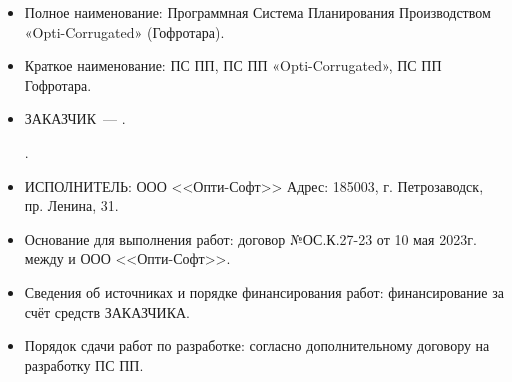 




\begin{itemize}

    \item Полное наименование: Программная Система Планирования Производством «Opti-Corrugated» (Гофротара).

    \item Краткое наименование: ПС ПП, ПС ПП «Opti-Corrugated», ПС ПП Гофротара.

    \item ЗАКАЗЧИК~--- \FIRMA.

\CURADDRESS.  

    \item ИСПОЛНИТЕЛЬ: ООО <<Опти-Софт>>
Адрес: 185003, г. Петрозаводск, пр. Ленина, 31.

    \item Основание для выполнения работ: договор {№ОС.К.27-23 от 10 мая 2023г.} между \FIRMA и ООО <<Опти-Софт>>.
    \item Сведения об источниках и порядке финансирования работ: финансирование за счёт средств ЗАКАЗЧИКА.

    \item Порядок сдачи работ по разработке: согласно дополнительному договору на разработку ПС ПП.

\end{itemize}


